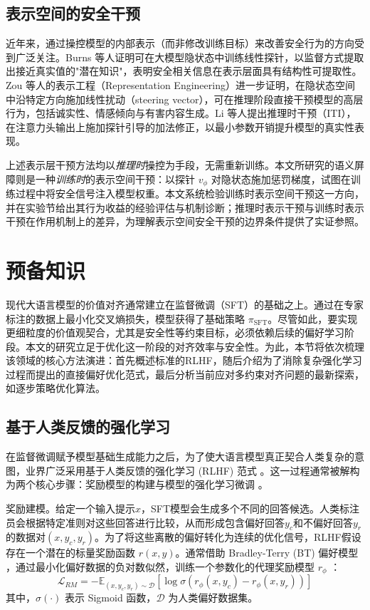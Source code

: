 \documentclass[lettersize,journal]{IEEEtran}
\begin{document}
\subsection{表示空间的安全干预}

近年来，通过操控模型的内部表示（而非修改训练目标）来改善安全行为的方向受到广泛关注。Burns 等人\cite{burns2023discovering}证明可在大模型隐状态中训练线性探针，以监督方式提取出接近真实值的"潜在知识"，表明安全相关信息在表示层面具有结构性可提取性。Zou 等人\cite{zou2023representation}的表示工程（Representation Engineering）进一步证明，在隐状态空间中沿特定方向施加线性扰动（steering vector），可在推理阶段直接干预模型的高层行为，包括诚实性、情感倾向与有害内容生成。Li 等人\cite{li2023inference}提出推理时干预（ITI），在注意力头输出上施加探针引导的加法修正，以最小参数开销提升模型的真实性表现。

上述表示层干预方法均以\emph{推理时}操控为手段，无需重新训练。本文所研究的语义屏障则是一种\emph{训练时}的表示空间干预：以探针 $v_\phi$ 对隐状态施加惩罚梯度，试图在训练过程中将安全信号注入模型权重。本文系统检验训练时表示空间干预这一方向，并在实验节给出其行为收益的经验评估与机制诊断；推理时表示干预与训练时表示干预在作用机制上的差异，为理解表示空间安全干预的边界条件提供了实证参照。

\section{预备知识}
现代大语言模型的价值对齐通常建立在监督微调（SFT）的基础之上。通过在专家标注的数据上最小化交叉熵损失，模型获得了基础策略 $\pi_{\text{SFT}}$。尽管如此，要实现更细粒度的价值观契合，尤其是安全性等约束目标，必须依赖后续的偏好学习阶段\cite{ziegler2019fine}。本文的研究立足于优化这一阶段的对齐效率与安全性。为此，本节将依次梳理该领域的核心方法演进：首先概述标准的RLHF，随后介绍为了消除复杂强化学习过程而提出的直接偏好优化范式，最后分析当前应对多约束对齐问题的最新探索，如逐步策略优化算法\cite{wachi2024stepwise}。
\subsection{基于人类反馈的强化学习}
在监督微调赋予模型基础生成能力之后，为了使大语言模型真正契合人类复杂的意图，业界广泛采用基于人类反馈的强化学习 (RLHF) 范式 。这一过程通常被解构为两个核心步骤：奖励模型的构建与模型的强化学习微调 。

奖励建模。给定一个输入提示$x$，SFT模型会生成多个不同的回答候选。人类标注员会根据特定准则对这些回答进行比较，从而形成包含偏好回答$y_c$和不偏好回答$y_r$的数据对$(x, y_c, y_r)$。为了将这些离散的偏好转化为连续的优化信号，RLHF假设存在一个潜在的标量奖励函数 $r(x, y)$。通常借助 Bradley-Terry (BT) 偏好模型 ，通过最小化偏好数据的负对数似然，训练一个参数化的代理奖励模型 $r_\phi$ ：
\begin{equation}
    \mathcal{L}_{RM} = -\mathbb{E}_{(x, y_c, y_r) \sim \mathcal{D}} [\log \sigma(r_\phi(x, y_c) - r_\phi(x, y_r))]
\end{equation}
其中，$\sigma(\cdot)$ 表示 Sigmoid 函数，$\mathcal{D}$ 为人类偏好数据集。
\end{document}
